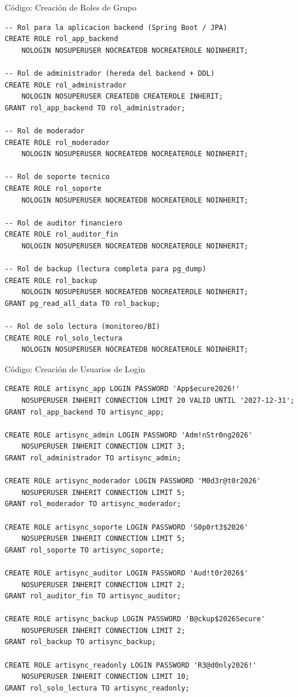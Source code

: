 \documentclass[aspectratio=169]{beamer}
\begin{document}
\begin{frame}{Código: Creación de Roles de Grupo}
    \begin{lstlisting}[title={Roles de Grupo (NOLOGIN)}]
-- Rol para la aplicacion backend (Spring Boot / JPA)
CREATE ROLE rol_app_backend
    NOLOGIN NOSUPERUSER NOCREATEDB NOCREATEROLE NOINHERIT;

-- Rol de administrador (hereda del backend + DDL)
CREATE ROLE rol_administrador
    NOLOGIN NOSUPERUSER CREATEDB CREATEROLE INHERIT;
GRANT rol_app_backend TO rol_administrador;

-- Rol de moderador
CREATE ROLE rol_moderador
    NOLOGIN NOSUPERUSER NOCREATEDB NOCREATEROLE NOINHERIT;

-- Rol de soporte tecnico
CREATE ROLE rol_soporte
    NOLOGIN NOSUPERUSER NOCREATEDB NOCREATEROLE NOINHERIT;

-- Rol de auditor financiero
CREATE ROLE rol_auditor_fin
    NOLOGIN NOSUPERUSER NOCREATEDB NOCREATEROLE NOINHERIT;

-- Rol de backup (lectura completa para pg_dump)
CREATE ROLE rol_backup
    NOLOGIN NOSUPERUSER NOCREATEDB NOCREATEROLE NOINHERIT;
GRANT pg_read_all_data TO rol_backup;

-- Rol de solo lectura (monitoreo/BI)
CREATE ROLE rol_solo_lectura
    NOLOGIN NOSUPERUSER NOCREATEDB NOCREATEROLE NOINHERIT;
    \end{lstlisting}
\end{frame}

\begin{frame}{Código: Creación de Usuarios de Login}
    \begin{lstlisting}[title={Usuarios de Login con contraseña}]
CREATE ROLE artisync_app LOGIN PASSWORD 'App$ecure2026!'
    NOSUPERUSER INHERIT CONNECTION LIMIT 20 VALID UNTIL '2027-12-31';
GRANT rol_app_backend TO artisync_app;

CREATE ROLE artisync_admin LOGIN PASSWORD 'Adm!nStr0ng2026'
    NOSUPERUSER INHERIT CONNECTION LIMIT 3;
GRANT rol_administrador TO artisync_admin;

CREATE ROLE artisync_moderador LOGIN PASSWORD 'M0d3r@t0r2026'
    NOSUPERUSER INHERIT CONNECTION LIMIT 5;
GRANT rol_moderador TO artisync_moderador;

CREATE ROLE artisync_soporte LOGIN PASSWORD 'S0p0rt3$2026'
    NOSUPERUSER INHERIT CONNECTION LIMIT 5;
GRANT rol_soporte TO artisync_soporte;

CREATE ROLE artisync_auditor LOGIN PASSWORD 'Aud!t0r2026$'
    NOSUPERUSER INHERIT CONNECTION LIMIT 2;
GRANT rol_auditor_fin TO artisync_auditor;

CREATE ROLE artisync_backup LOGIN PASSWORD 'B@ckup$2026Secure'
    NOSUPERUSER INHERIT CONNECTION LIMIT 2;
GRANT rol_backup TO artisync_backup;

CREATE ROLE artisync_readonly LOGIN PASSWORD 'R3@d0nly2026!'
    NOSUPERUSER INHERIT CONNECTION LIMIT 10;
GRANT rol_solo_lectura TO artisync_readonly;
    \end{lstlisting}
\end{frame}
\end{document}
